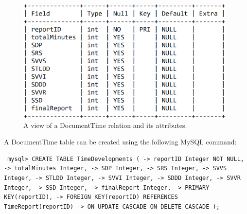 \documentclass{article}
\begin{document}
\begin{figure}[H]
     \centering
     \includegraphics[width=11cm]{images/SQL_tables/documenttime.png}
     \renewcommand\figurename{Figure}
     \caption{A view of a DocumentTime relation and its attributes.}
     \label{fig:my_label}
 \end{figure}
\newline

A DocumentTime table can be created using the following MySQL command:
\newline

\small
\texttt{
\noindent mysql> CREATE TABLE TimeDevelopments (\newline
\indent\indent\indent -> reportID Integer NOT NULL,\newline
\indent\indent\indent -> totalMinutes Integer,\newline
\indent\indent\indent -> SDP Integer,\newline
\indent\indent\indent -> SRS Integer,\newline
\indent\indent\indent -> SVVS Integer,\newline
\indent\indent\indent -> STLDD Integer,\newline
\indent\indent\indent -> SVVI Integer,\newline
\indent\indent\indent -> SDDD Integer,\newline
\indent\indent\indent -> SVVR Integer,\newline
\indent\indent\indent -> SSD Integer,\newline
\indent\indent\indent -> finalReport Integer,\newline
\indent\indent\indent -> PRIMARY KEY(reportID),\newline
\indent\indent\indent -> FOREIGN KEY(reportID) REFERENCES TimeReport(reportID)\newline
\indent\indent\indent -> ON UPDATE CASCADE ON DELETE CASCADE );\newline
}
\normalsize
\end{document}
